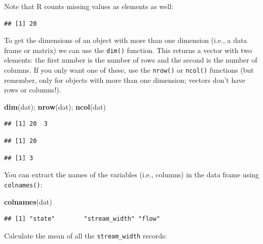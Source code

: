 \documentclass[]{book}
\newenvironment{Shaded}{\begin{snugshade}}{\end{snugshade}}
\newcommand{\KeywordTok}[1]{\textcolor[rgb]{0.13,0.29,0.53}{\textbf{#1}}}
\newcommand{\OperatorTok}[1]{\textcolor[rgb]{0.81,0.36,0.00}{\textbf{#1}}}
\newcommand{\NormalTok}[1]{#1}
\theoremstyle{definition}
\theoremstyle{definition}
\theoremstyle{definition}
\theoremstyle{remark}
\begin{document}
Note that R counts missing values as elements as well:

\begin{Shaded}
\end{Shaded}

\begin{verbatim}
## [1] 20
\end{verbatim}

To get the dimensions of an object with more than one dimension (i.e., a
data frame or matrix) we can use the \texttt{dim()} function. This
returns a vector with two elements: the first number is the number of
rows and the second is the number of columns. If you only want one of
these, use the \texttt{nrow()} or \texttt{ncol()} functions (but
remember, only for objects with more than one dimension; vectors don't
have rows or columns!).

\begin{Shaded}
\begin{Highlighting}[]
\KeywordTok{dim}\NormalTok{(dat); }\KeywordTok{nrow}\NormalTok{(dat); }\KeywordTok{ncol}\NormalTok{(dat)}
\end{Highlighting}
\end{Shaded}

\begin{verbatim}
## [1] 20  3
\end{verbatim}

\begin{verbatim}
## [1] 20
\end{verbatim}

\begin{verbatim}
## [1] 3
\end{verbatim}

You can extract the names of the variables (i.e., columns) in the data
frame using \texttt{colnames()}:

\begin{Shaded}
\begin{Highlighting}[]
\KeywordTok{colnames}\NormalTok{(dat)}
\end{Highlighting}
\end{Shaded}

\begin{verbatim}
## [1] "state"        "stream_width" "flow"
\end{verbatim}

Calculate the mean of all the \texttt{stream\_width} records:
\end{document}
